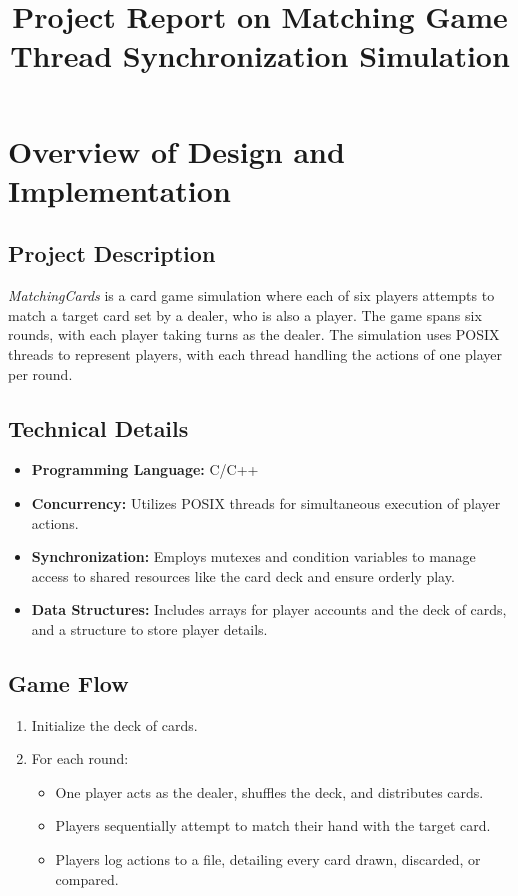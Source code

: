 \documentclass{article}
\title{Project Report on Matching Game Thread Synchronization Simulation}
\author{}
\date{}
\begin{document}
\maketitle

\section*{Overview of Design and Implementation}

\subsection*{Project Description}
\textit{MatchingCards} is a card game simulation where each of six players attempts to match a target card set by a dealer, who is also a player. The game spans six rounds, with each player taking turns as the dealer. The simulation uses POSIX threads to represent players, with each thread handling the actions of one player per round.

\subsection*{Technical Details}
\begin{itemize}
    \item \textbf{Programming Language:} C/C++
    \item \textbf{Concurrency:} Utilizes POSIX threads for simultaneous execution of player actions.
    \item \textbf{Synchronization:} Employs mutexes and condition variables to manage access to shared resources like the card deck and ensure orderly play.
    \item \textbf{Data Structures:} Includes arrays for player accounts and the deck of cards, and a structure to store player details.
\end{itemize}

\subsection*{Game Flow}
\begin{enumerate}
    \item Initialize the deck of cards.
    \item For each round:
    \begin{itemize}
        \item One player acts as the dealer, shuffles the deck, and distributes cards.
        \item Players sequentially attempt to match their hand with the target card.
        \item Players log actions to a file, detailing every card drawn, discarded, or compared.
    \end{itemize}
\end{enumerate}
\end{document}
